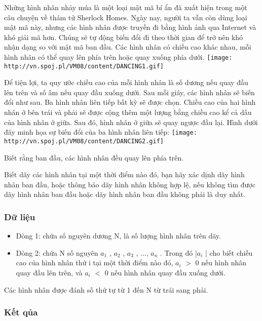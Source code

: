 



   Những hình nhân nhảy múa là một loại mật mã bí ẩn đã xuất hiện trong một câu chuyện về thám tử Sherlock Homes.  Ngày nay, người ta vẫn còn dùng loại mật mã này, nhưng các hình nhân được truyền đi bằng hình ảnh qua Internet và khó giải mã hơn. Chúng sẽ tự động biến đổi đi theo thời gian để trở nên khó nhận dạng so với mật mã ban đầu. Các hình nhân có chiều cao khác nhau, mỗi hình nhân có thể quay lên phía trên hoặc quay xuống phía dưới.  
\texttt{[image: http://vn.spoj.pl/VM08/content/DANCING1.gif]}

   Để tiện lợi, ta quy ước chiều cao của mỗi hình nhân là số dương nếu quay đầu lên trên và số âm nếu quay đầu xuống dưới.  Sau mỗi giây, các hình nhân sẽ biến đổi như sau. Ba hình nhân liên tiếp bất kỳ sẽ được chọn. Chiều cao của hai hình nhân ở bên trái và phải sẽ được cộng thêm một lượng bằng       chiều cao kể cả dấu      của hình nhân ở giữa. Sau đó, hình nhân ở giữa sẽ quay ngược đầu lại. Hình dưới đây minh họa sự biến đổi của ba hình nhân liên tiếp:  
\texttt{[image: http://vn.spoj.pl/VM08/content/DANCING2.gif]}

   Biết rằng ban đầu, các hình nhân       đều quay lên phía trên.     

   Biết dãy các hình nhân tại một thời điểm nào đó, bạn hãy xác dịnh dãy hình nhân ban đầu, hoặc thông báo dãy hình nhân không hợp lệ, nếu không tìm được dãy hình nhân ban đầu hoặc dãy hình nhân ban đầu không phải là duy nhất.  

\subsubsection{   Dữ liệu  }
\begin{itemize}
	\item     Dòng 1: chứa số nguyên dương N, là số lượng hình nhân trên dãy.   
	\item     Dòng 2: chứa N số nguyên $a_{1}$    , $a_{2}$    , $a_{3}$    , ..., $a_{n}$    . Trong đó |$a_{i}$    | cho biết chiều cao của hình nhân thứ i tại một thời điểm nào đó, $a_{i}$    $>$ 0 nếu hình nhân quay đầu lên trên, và $a_{i}$    $<$ 0 nếu hình nhân quay đầu xuống dưới.   
\end{itemize}

   Các hình nhân được đánh số thứ tự từ 1 đến N từ trái sang phải.  

\subsubsection{   Kết qủa  }

